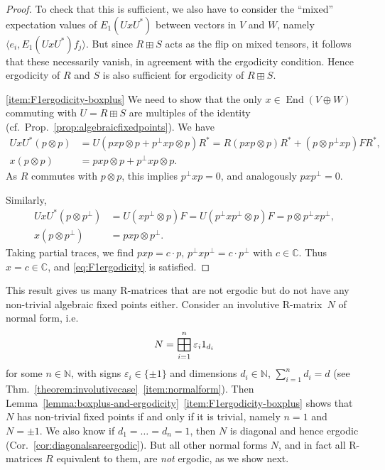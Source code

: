 \documentclass[12pt,a4paper]{amsart}
\numberwithin{equation}{section}
\theoremstyle{remark}
\def\End{\operatorname{End}}
\newcommand{\ot}{\otimes}
\newcommand{\Cl}{\mathbb{C}}
\newcommand{\Nl}{\mathbb{N}}
\newcommand{\eps}{\varepsilon}
\newcommand{\bigboxplus}{
  \mathop{
    \vphantom{\bigoplus} 
    \mathchoice
      {\vcenter{\hbox{\resizebox{\widthof{$\displaystyle\bigoplus$}}{!}{$\boxplus$}}}}
      {\vcenter{\hbox{\resizebox{\widthof{$\bigoplus$}}{!}{$\boxplus$}}}}
      {\vcenter{\hbox{\resizebox{\widthof{$\scriptstyle\oplus$}}{!}{$\boxplus$}}}}
      {\vcenter{\hbox{\resizebox{\widthof{$\scriptscriptstyle\oplus$}}{!}{$\boxplus$}}}}
  }\displaylimits 
}
\begin{document}
\begin{proof}
    To check that this is sufficient, we also have to consider the ``mixed'' expectation values of $E_1(UxU^*)$ between vectors in $V$ and $W$, namely $\langle e_i,E_1(UxU^*)f_j\rangle$. But since $R\boxplus S$ acts as the flip on mixed tensors, it follows that these necessarily vanish, in agreement with the ergodicity condition. Hence ergodicity of $R$ and $S$ is also sufficient for ergodicity of $R\boxplus S$.

    \ref{item:F1ergodicity-boxplus} We need to show that the only $x\in\End(V\oplus W)$ commuting with $U=R\boxplus S$ are multiples of the identity (cf.~Prop.~\ref{prop:algebraicfixedpoints}). We have
    \begin{align*}
        UxU^*(p\ot p)
        &=
        U(pxp\ot p+p^\perp xp\ot p)R^*
        =
        R(pxp\ot p)R^*+(p\ot p^\perp xp)FR^*
        ,\\
        x(p\ot p)
        &=
        pxp\ot p+p^\perp xp\ot p.
    \end{align*}
    As $R$ commutes with $p\ot p$, this implies $p^\perp xp=0$, and analogously $pxp^\perp=0$.
    
    Similarly,
    \begin{align*}
     UxU^*(p\ot p^\perp)
     &=
     U(xp^\perp\ot p)F
     =
     U(p^\perp xp^\perp\ot p)F
     =
     p\ot p^\perp xp^\perp,
     \\
     x(p\ot p^\perp)
     &=
     pxp\ot p^\perp.
    \end{align*}
    Taking partial traces, we find $pxp=c\cdot p$, $p^\perp xp^\perp =c\cdot p^\perp$ with $c\in\Cl$. Thus $x=c\in\Cl$, and \eqref{eq:F1ergodicity} is satisfied.
\end{proof}

This result gives us many R-matrices that are not ergodic but do not have any non-trivial algebraic fixed points either. Consider an involutive R-matrix~$N$ of normal form, i.e. 
\begin{align}\label{eq:normal2}
 N=\bigboxplus_{i=1}^n\eps_i1_{d_i}
\end{align}
for some $n\in\Nl$, with signs $\eps_i\in\{\pm1\}$ and dimensions $d_i\in\Nl$, $\sum_{i=1}^nd_i=d$ (see Thm.~\ref{theorem:involutivecase}~\ref{item:normalform}). Then Lemma~\ref{lemma:boxplus-and-ergodicity}~\ref{item:F1ergodicity-boxplus} shows that $N$ has non-trivial fixed points if and only if it is trivial, namely $n=1$ and $N=\pm1$. We also know if $d_1=\ldots=d_n=1$, then $N$ is diagonal and hence ergodic (Cor.~\ref{cor:diagonalsareergodic}). But all other normal forms $N$, and in fact all R-matrices $R$ equivalent to them, are {\em not} ergodic, as we show next.
\end{document}
